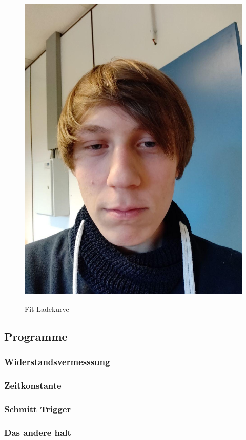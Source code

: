 \documentclass[12pt,twoside,a4paper]{scrartcl}
\begin{document}
\begin{figure}[H]
\begin{minipage}{0.4 \textwidth}
{						\includegraphics[width = \textwidth]{Pictures/Platzhalter}
					}
				\caption{Fit Ladekurve}
				\end{minipage}
			\end{figure}

	\subsection{Programme}
		\subsubsection{Widerstandsvermesssung}

		\subsubsection{Zeitkonstante}
			\label{Programme::Kondensator
			}
		\subsubsection{Schmitt Trigger}

		\subsubsection{Das andere halt}
\end{document}
